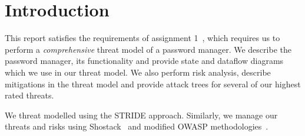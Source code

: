 \chapter{Introduction}
\label{ch:introduction}

This report satisfies the requirements of assignment
1~\cite{2017myersa1handout}, which requires us to perform a
\textit{comprehensive} threat model of a password manager.  We describe the
password manager, its functionality and provide state and dataflow diagrams
which we use in our threat model. We also perform risk analysis, describe
mitigations in the threat model and provide attack trees for several of our
highest rated threats.  

\par We threat modelled using the STRIDE approach.
Similarly, we manage our threats and risks using Shostack~\cite{shostackbook} and
modified OWASP methodologies~\cite{owasprisk}.




